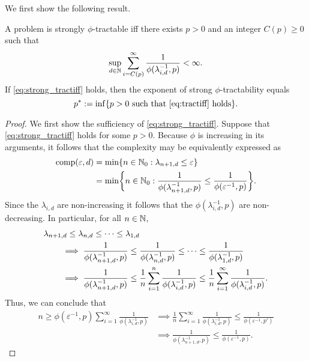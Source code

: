 \documentclass[11pt,a4paper]{article}
\begin{document}
We first show the following result. 
\begin{theorem}\label{thm_main_strong_tract} 
A problem is strongly $\phi$-tractable iff there exists $p>0$ and an integer $C(p)\ge 0$ such that
\begin{equation} \label{eq:strong_tractiff}
     \sup_{d \in \mathbb{N}} \sum_{i = C(p)}^\infty \frac{1}{\phi(\lambda_{i, d}^{-1},p)} < \infty.
\end{equation}
If \eqref{eq:strong_tractiff} holds, then the exponent of strong $\phi$-tractability equals
\[
 p^* := \inf\{p>0\ \mbox{such that \eqref{eq:tractiff} holds}\}.
\]

\end{theorem}

\begin{proof}
We first show the sufficiency of \eqref{eq:strong_tractiff}. Suppose that \eqref{eq:strong_tractiff} holds for some $p>0$.  
Because $\phi$ is increasing in its arguments, it follows that the complexity may be equivalently expressed as 
\begin{align*}
    \operatorname{comp}(\varepsilon, d) &= \min \{n \in \mathbb{N}_{0} : \lambda_{n+1, d} \le \varepsilon\} \\
    &= \min \biggl\{n \in \mathbb{N}_{0} : \frac{1}{\phi(\lambda_{n+1, d}^{-1},p)} \le \frac{1}{\phi(\varepsilon^{-1},p)} \biggr\}.
\end{align*}
Since the $\lambda_{i,d}$ are non-increasing it follows that the $\phi(\lambda_{i, d}^{-1},p)$ are non-decreasing. 
In particular, for all $n \in \mathbb{N}$,
\begin{align*}
    \MoveEqLeft{\lambda_{n+1,d} \le \lambda_{n,d} \le \cdots \le \lambda_{1,d}} \\
    & \implies \frac{1}{\phi(\lambda_{n+1, d}^{-1},p)} \le \frac{1}{\phi(\lambda_{n, d}^{-1},p)} \le \cdots \le \frac{1}{\phi(\lambda_{1, d}^{-1},p)} \\
    & \implies \frac{1}{\phi(\lambda_{n+1, d}^{-1},p)} 
    \le \frac 1n \sum_{i=1}^n  \frac{1}{\phi(\lambda_{i, d}^{-1},p)} 
    \le \frac 1n \sum_{i=1}^\infty  \frac{1}{\phi(\lambda_{i, d}^{-1},p)}.
\end{align*}
Thus, we can conclude that 
\begin{align*}
    n \ge \phi(\varepsilon^{-1},p) \sum_{i=1}^\infty \frac{1}{\phi(\lambda_{i, d}^{-1},p)}
    & \implies 
  \frac 1n \sum_{i=1}^\infty \frac{1}{\phi(\lambda_{i, d}^{-1},p)} \le  \frac{1}{\phi(\varepsilon^{-1},p')} \\
   & \implies   \frac{1}{\phi(\lambda_{n+1, d}^{-1},p)} \le \frac{1}{\phi(\varepsilon^{-1},p)}.

\end{align*}
\end{proof}
\end{document}
